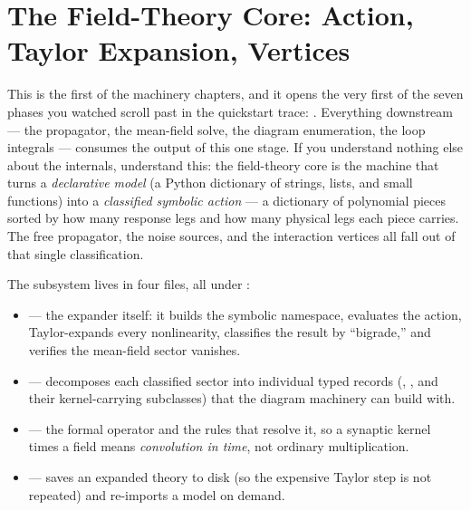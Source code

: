 \chapter{The Field-Theory Core: Action, Taylor Expansion, Vertices}\label{ch:fieldtheory-core}

This is the first of the machinery chapters, and it opens the very first of the
seven phases you watched scroll past in the quickstart trace: . Everything downstream --- the propagator, the mean-field
solve, the diagram enumeration, the loop integrals --- consumes the output of
this one stage. If you understand nothing else about the internals, understand
this: the field-theory core is the machine that turns a \emph{declarative model}
(a Python dictionary of strings, lists, and small functions) into a
\emph{classified symbolic action} --- a dictionary of polynomial pieces sorted by
how many response legs and how many physical legs each piece carries. The free
propagator, the noise sources, and the interaction vertices all fall out of that
single classification.

The subsystem lives in four files, all under :

\begin{itemize}
  \item {} --- the  expander itself: it
        builds the symbolic namespace, evaluates the action, Taylor-expands every
        nonlinearity, classifies the result by ``bigrade,'' and verifies the
        mean-field sector vanishes.
  \item {} --- decomposes each classified sector into individual
        typed records (, , and their
        kernel-carrying subclasses) that the diagram machinery can build with.
  \item {} --- the formal  operator
        and the rules that resolve it, so a synaptic kernel times a field means
        \emph{convolution in time}, not ordinary multiplication.
  \item {} --- saves an expanded theory to disk (so the
        expensive Taylor step is not repeated) and re-imports a model on demand.
\end{itemize}

